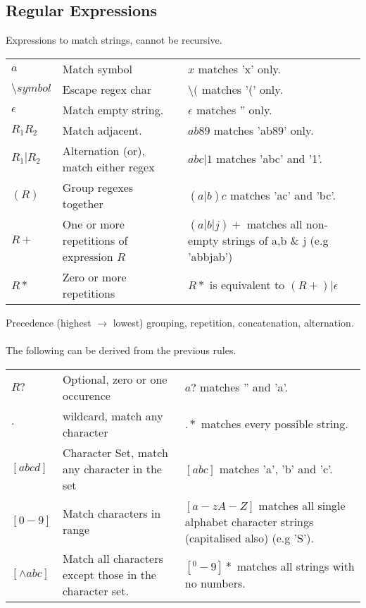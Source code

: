 \documentclass{report}
\begin{document}
        \subsection*{Regular Expressions}
            Expressions to match strings, cannot be recursive.
            \begin{center}
                \begin{tabular}{l l l}
                    $a$ & Match symbol & $x$ matches 'x' only. \\
                    $\text{\textbackslash}symbol$ & Escape regex char & $\text{\textbackslash}($ matches '(' only. \\
                    $\epsilon$ & Match empty string. & $\epsilon$ matches '' only. \\
                    $R_1R_2$ & Match adjacent. & $ab89$ matches 'ab89' only. \\
                    $R_1|R_2$ & Alternation (or), match either regex & $abc|1$ matches 'abc' and '1'. \\
                    $(R)$ & Group regexes together & $(a|b)c$ matches 'ac' and 'bc'.\\
                    $R+$ & One or more repetitions of expression $R$ & $(a|b|j)+$ matches all non-empty strings of a,b \& j (e.g 'abbjab') \\
                    $R*$ & Zero or more repetitions & $R*$ is equivalent to $(R+)|\epsilon$ \\
                \end{tabular}
            \end{center}
            Precedence (highest $\to$ lowest) grouping, repetition, concatenation, alternation.
            \\
            \\ The following can be derived from the previous rules.
            \begin{center}
                \begin{tabular}{l l l}
                    $R?$ & Optional, zero or one occurence & $a?$ matches '' and 'a'. \\
                    $.$ & wildcard, match any character & $.*$ matches every possible string. \\
                    $[abcd]$ & Character Set, match any character in the set & $[abc]$ matches 'a', 'b' and 'c'. \\
                    $[0-9]$ & Match characters in range & $[a-zA-Z]$ matches all single alphabet character strings (capitalised also) (e.g 'S'). \\
                    $[\land abc]$ & Match all characters except those in the character set. & $[^0-9]*$ matches all strings with no numbers. \\
                \end{tabular}
            \end{center}
\end{document}
